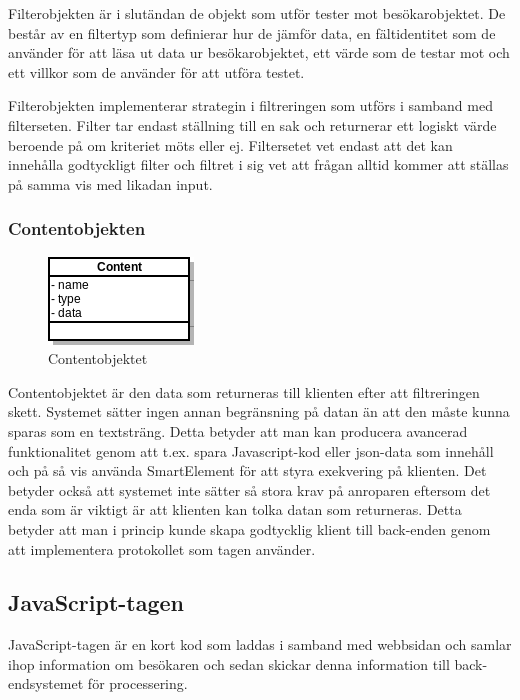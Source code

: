 Filterobjekten är i slutändan de objekt som utför tester mot besökarobjektet. De består av en filtertyp som definierar hur de jämför data, en fältidentitet som de använder för att läsa ut data ur besökarobjektet, ett värde som de testar mot och ett villkor som de använder för att utföra testet.

Filterobjekten implementerar strategin i filtreringen som utförs i samband med filterseten. Filter tar endast ställning till en sak och returnerar ett logiskt värde beroende på om kriteriet möts eller ej. Filtersetet vet endast att det kan innehålla godtyckligt filter och filtret i sig vet att frågan alltid kommer att ställas på samma vis med likadan input.

\subsubsection{Contentobjekten}

\begin{figure}[h!]
\centering
\includegraphics[scale=1]{assets/images/umlContent.png}
\caption{Contentobjektet}
\label{contenttuml}
\end{figure}

Contentobjektet är den data som returneras till klienten efter att filtreringen skett. Systemet sätter ingen annan begränsning på datan än att den måste kunna sparas som en textsträng. Detta betyder att man kan producera avancerad funktionalitet genom att t.ex. spara Javascript-kod eller \gls{json}-data som innehåll och på så vis använda SmartElement för att styra exekvering på klienten. Det betyder också att systemet inte sätter så stora krav på anroparen eftersom det enda som är viktigt är att klienten kan tolka datan som returneras. Detta betyder att man i princip kunde skapa godtycklig klient till back-enden genom att implementera protokollet som tagen använder.

\subsection{JavaScript-tagen}

JavaScript-tagen är en kort kod som laddas i samband med webbsidan och samlar ihop information om besökaren och sedan skickar denna information till back-endsystemet för processering.

